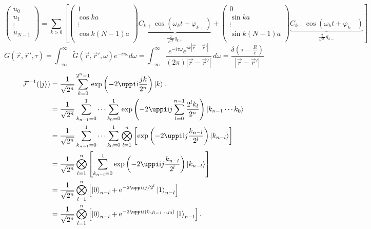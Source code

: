 \documentclass { article }
\begin{document}
\[\left( \begin{matrix}
{{u}_{0}}  \\
{{u}_{1}}  \\
\vdots   \\
{{u}_{N-1}}  \\
\end{matrix} \right)=\sum\limits_{k>0}{\left[ \left( \begin{matrix}
	1  \\
	\cos ka  \\
	\vdots   \\
	\cos k\left( N-1 \right)a  \\
	\end{matrix} \right)\underbrace{{{C}_{k+}}\cos \left( {{\omega }_{k}}t+{{\varphi }_{k+}} \right)}_{\frac{2}{\sqrt{N}}{{q}_{k+}}}+\left( \begin{matrix}
	0  \\
	\sin ka  \\
	\vdots   \\
	\sin k\left( N-1 \right)a  \\
	\end{matrix} \right)\underbrace{{{C}_{k-}}\cos \left( {{\omega }_{k}}t+{{\varphi }_{k-}} \right)}_{\frac{2}{\sqrt{N}}{{q}_{k-}}} \right]}\]
\[G(\vec{r},{\vec{r}}',\tau )=\int _{-\infty }^{\infty }\tilde{G}(\vec{r},{\vec{r}}',\omega )e^{-i \tau  \omega }d\omega=\int_{-\infty }^{\infty } \frac{e^{-i \tau  \omega } e^{i k |\vec{r}-{\vec{r}}'| }}{(2 \pi ) |\vec{r}-{\vec{r}}'| } \, d\omega=\frac{\delta  \left(\tau -\frac{R}{c}\right)}{|\vec{r}-{\vec{r}}'| }\]
\[
\begin{split}	
\mathcal{F}^{-1}(\ket{j})
&{}=\frac{1}{\sqrt{2^n}}\sum_{k=0}^{2^n-1}\exp\left(-2\uppi \ii \frac{jk}{2^n}\right)\ket{k}.\\
&{}=\frac{1}{\sqrt{2^n}}\sum_{k_{n-1}=0}^1\cdots\sum_{k_{0}=0}^1\exp\left(-2\uppi \ii j\sum_{l=0}^{n-1}\frac{2^l k_l}{2^n}\right)\ket{k_{n-1}\cdots k_0}\\
&{}=\frac{1}{\sqrt{2^n}}\sum_{k_{n-1}=0}^1\cdots\sum_{k_{0}=0}^1\bigotimes_{l=1}^n\left[\exp\left(-2\uppi \ii j\frac{k_{n-l}}{2^l}\right)\ket{k_{n-l}}\right]\\
&{}=\frac{1}{\sqrt{2^n}}\bigotimes_{l=1}^n\left[\sum_{k_{n-l}=0}^1\exp\left(-2\uppi \ii j\frac{k_{n-l}}{2^l}\right)\ket{k_{n-l}}\right]\\
&{}=\frac{1}{\sqrt{2^n}}\bigotimes_{l=1}^n\left[\ket{0}_{n-l}+\ee^{-2\uppi \ii j /2^l}\ket{1}_{n-l}\right]\\
&{}=\frac{1}{\sqrt{2^n}}\bigotimes_{l=1}^n\left[\ket{0}_{n-l}+\ee^{-2\uppi \ii ({0.j_{l-1}\ldots j_0})}\ket{1}_{n-l}\right].
\end{split}
\]
\end{document}
